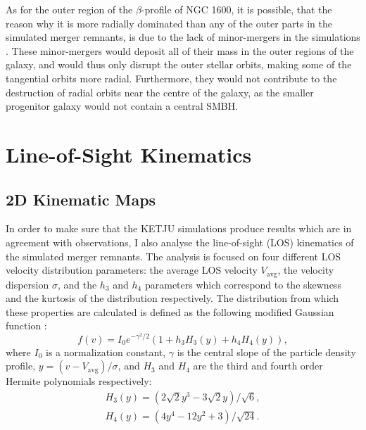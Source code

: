 \documentclass[english, oneside]{HYgradu}
\begin{document}
As for the outer region of the $\beta$-profile of NGC 1600, it is possible, that the reason why it is more radially dominated than any of the outer parts in the simulated merger remnants, is due to the lack of minor-mergers in the simulations \citep{Rantala2018}. These minor-mergers would deposit all of their mass in the outer regions of the galaxy, and would thus only disrupt the outer stellar orbits, making some of the tangential orbits more radial. Furthermore, they would not contribute to the destruction of radial orbits near the centre of the galaxy, as the smaller progenitor galaxy would not contain a central SMBH.

\section{Line-of-Sight Kinematics}

\subsection{2D Kinematic Maps}

In order to make sure that the KETJU simulations produce results which are in agreement with observations, I  also analyse the line-of-sight (LOS) kinematics of the simulated merger remnants. The analysis is focused on four different LOS velocity distribution parameters: the average LOS velocity $V_\mathrm{avg}$, the velocity dispersion $\sigma$, and the $h_3$ and $h_4$ parameters which correspond to the skewness and the kurtosis of the distribution respectively. The distribution from which these properties are calculated is defined as the following modified Gaussian function \citep{VanDerMarel1993, Bender1994}:
\begin{equation}
f(v) = I_0 e^{-\gamma^2/2}(1 + h_3 H_3(y) + h_4 H_4(y)), \label{eq:mod_gaussian}
\end{equation} 
where $I_0$ is a normalization constant, $\gamma$ is the central slope of the particle density profile, $y = (v - V_\mathrm{avg})/\sigma$, and $H_3$ and $H_4$ are the third and fourth order Hermite polynomials respectively:
\begin{eqnarray}
H_3(y) = \left(2\sqrt{2}y^3 - 3\sqrt{2}y\right) / \sqrt{6}, \\
H_4(y) = \left(4y^4 - 12y^2 + 3 \right) / \sqrt{24}.
\end{eqnarray}
\end{document}
